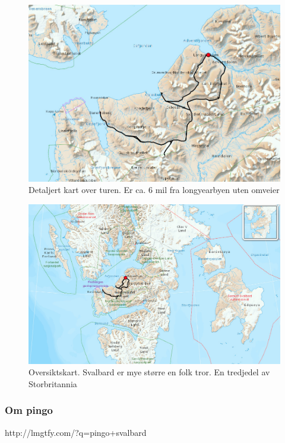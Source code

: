 \begin{figure}[H]
\centering
\includegraphics[scale=0.22]{Turbarentsburgliten}
\caption*{Detaljert kart over turen. Er ca. 6 mil fra longyearbyen uten
omveier}
\label{fig:barentsburgturliten}
\end{figure}

\begin{figure}[H]
\centering
\includegraphics[scale=0.22]{Turbarentsburgstor}
\caption*{Oversiktskart. Svalbard er mye større en folk tror. En
tredjedel av Storbritannia}
\label{fig:barentsburgoversiktskart}
\end{figure}

\subsubsection{Om pingo}
http://lmgtfy.com/?q=pingo+svalbard


